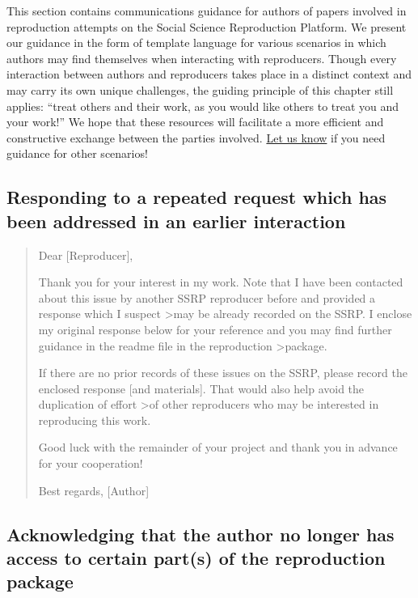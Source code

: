 \documentclass[]{book}
\begin{document}
This section contains communications guidance for authors of papers involved in reproduction attempts on the Social Science Reproduction Platform. We present our guidance in the form of template language for various scenarios in which authors may find themselves when interacting with reproducers. Though every interaction between authors and reproducers takes place in a distinct context and may carry its own unique challenges, the guiding principle of this chapter still applies: ``treat others and their work, as you would like others to treat you and your work!'' We hope that these resources will facilitate a more efficient and constructive exchange between the parties involved. \href{mailto:acre@berkeley.edu}{Let us know} if you need guidance for other scenarios!

\hypertarget{responding-to-a-repeated-request-which-has-been-addressed-in-an-earlier-interaction}{%
\subsection{Responding to a repeated request which has been addressed in an earlier interaction}\label{responding-to-a-repeated-request-which-has-been-addressed-in-an-earlier-interaction}}

\begin{quote}
Dear {[}Reproducer{]},

Thank you for your interest in my work. Note that I have been contacted about this issue by another SSRP reproducer before and provided a response which I suspect \textgreater{}may be already recorded on the SSRP. I enclose my original response below for your reference and you may find further guidance in the readme file in the reproduction \textgreater{}package.

If there are no prior records of these issues on the SSRP, please record the enclosed response {[}and materials{]}. That would also help avoid the duplication of effort \textgreater{}of other reproducers who may be interested in reproducing this work.

Good luck with the remainder of your project and thank you in advance for your cooperation!

Best regards,
{[}Author{]}
\end{quote}

\hypertarget{acknowledging-that-the-author-no-longer-has-access-to-certain-parts-of-the-reproduction-package}{%
\subsection{Acknowledging that the author no longer has access to certain part(s) of the reproduction package}\label{acknowledging-that-the-author-no-longer-has-access-to-certain-parts-of-the-reproduction-package}}
\end{document}
